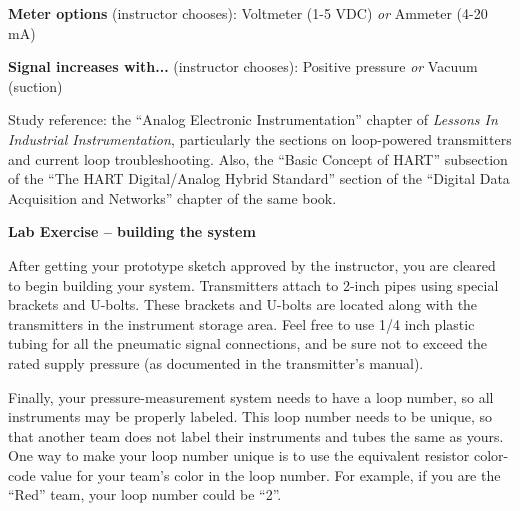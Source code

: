 \vskip 10pt

\noindent
{\bf Meter options} (instructor chooses): \hskip 20pt \underbar{\hskip 20pt} Voltmeter (1-5 VDC) \hskip 10pt {\it or} \hskip 10pt \underbar{\hskip 20pt} Ammeter (4-20 mA)

\vskip 10pt

\noindent
{\bf Signal increases with...} (instructor chooses): \hskip 20pt \underbar{\hskip 20pt} Positive pressure \hskip 10pt {\it or} \hskip 10pt \underbar{\hskip 20pt} Vacuum (suction)

\vskip 10pt

\vfil

Study reference: the ``Analog Electronic Instrumentation'' chapter of {\it Lessons In Industrial Instrumentation}, particularly the sections on loop-powered transmitters and current loop troubleshooting.  Also, the ``Basic Concept of HART'' subsection of the ``The HART Digital/Analog Hybrid Standard'' section of the ``Digital Data Acquisition and Networks'' chapter of the same book.






\vfil \eject

\noindent
{\bf Lab Exercise -- building the system}

\vskip 5pt

After getting your prototype sketch approved by the instructor, you are cleared to begin building your system.  Transmitters attach to 2-inch pipes using special brackets and U-bolts.  These brackets and U-bolts are located along with the transmitters in the instrument storage area.  Feel free to use 1/4 inch plastic tubing for all the pneumatic signal connections, and be sure not to exceed the rated supply pressure (as documented in the transmitter's manual).

Finally, your pressure-measurement system needs to have a loop number, so all instruments may be properly labeled.  This loop number needs to be unique, so that another team does not label their instruments and tubes the same as yours.  One way to make your loop number unique is to use the equivalent resistor color-code value for your team's color in the loop number.  For example, if you are the ``Red'' team, your loop number could be ``2''. 


